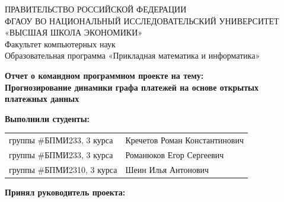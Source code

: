 \begin{titlepage}
\newpage

{
\begin{center}
ПРАВИТЕЛЬСТВО РОССИЙСКОЙ ФЕДЕРАЦИИ\\
ФГАОУ ВО НАЦИОНАЛЬНЫЙ ИССЛЕДОВАТЕЛЬСКИЙ УНИВЕРСИТЕТ\\
«ВЫСШАЯ ШКОЛА ЭКОНОМИКИ»
\\
\bigskip
Факультет компьютерных наук\\
Образовательная программа «Прикладная математика и информатика»
\end{center}
}

\begin{center}
{\bf Отчет о командном программном проекте на тему:}\\
{\bf Прогнозирование динамики графа платежей на основе открытых платежных данных}\\
\end{center}

\vspace{2em}

{\bf Выполнили студенты: \vspace{2mm}}

{
\begin{tabular}{l@{\hskip 1.5cm}l}
группы \#БПМИ233, 3 курса & Кречетов Роман Константинович \\
группы \#БПМИ233, 3 курса & Романюков Егор Сергеевич \\
группы \#БПМИ2310, 3 курса & Шеин Илья Антонович 
\end{tabular}}


\vspace{1em}
{\bf Принял руководитель проекта: \vspace{2mm}}


\end{titlepage}
